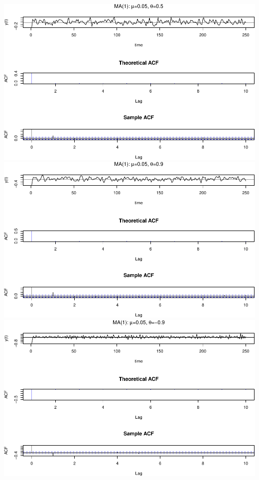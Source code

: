 \documentclass[]{article}
\begin{document}
\includegraphics{homework_4_markdown_files/figure-latex/unnamed-chunk-2-1.pdf}
\includegraphics{homework_4_markdown_files/figure-latex/unnamed-chunk-2-2.pdf}
\includegraphics{homework_4_markdown_files/figure-latex/unnamed-chunk-2-3.pdf}
\end{document}

